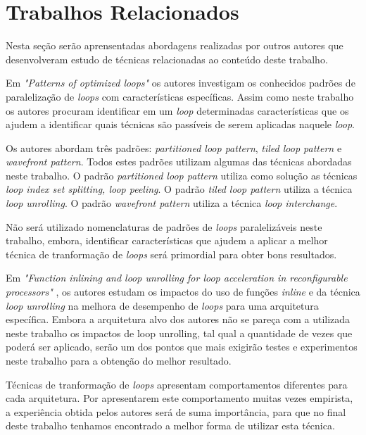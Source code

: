 
\chapter{Trabalhos Relacionados}

Nesta seção serão aprensentadas abordagens realizadas por outros autores que 
desenvolveram estudo de técnicas relacionadas ao conteúdo deste trabalho.

Em \textit{"Patterns of optimized loops"} \cite{Tasharofi:2010} os autores
investigam os conhecidos padrões de paralelização de \textit{loops} com
características específicas.  
Assim como neste trabalho os autores procuram identificar em um 
\textit{loop} determinadas características que os ajudem a identificar quais
técnicas são passíveis de serem aplicadas naquele \textit{loop}.

Os autores abordam três padrões: \textit{partitioned loop pattern}, \textit{tiled
loop pattern} e \textit{wavefront pattern}. 
Todos estes padrões utilizam algumas das técnicas abordadas neste trabalho. 
O padrão \textit{partitioned loop pattern} utiliza como solução as técnicas
\textit{loop index set splitting, loop peeling}. 
O padrão \textit{tiled loop pattern} utiliza a técnica \textit{loop unrolling}. 
O padrão \textit{wavefront pattern} utiliza a técnica \textit{loop interchange}.

Não será utilizado nomenclaturas de padrões de \textit{loops} paralelizáveis
neste trabalho, embora, identificar características que ajudem a aplicar a
melhor técnica de tranformação de \textit{loops} será primordial para obter bons
resultados.


Em \textit{"Function inlining and loop unrolling for loop acceleration in
reconfigurable processors"} \cite{Miniskar:2012}, os autores estudam os impactos
do uso de funções \textit{inline} e da técnica \textit{loop unrolling} na
melhora de desempenho de \textit{loops} para uma arquitetura específica.
Embora a arquitetura alvo dos autores não se pareça com a utilizada neste trabalho 
os impactos de loop unrolling, tal qual a quantidade de vezes que poderá ser 
aplicado, serão um dos pontos que mais exigirão testes e experimentos neste 
trabalho para a obtenção do melhor resultado.

Técnicas de tranformação de \textit{loops} apresentam comportamentos diferentes 
para cada arquitetura. 
Por apresentarem este comportamento muitas vezes empirista, a experiência obtida
pelos autores será de suma importância, para que no final deste trabalho tenhamos
encontrado a melhor forma de utilizar esta técnica.

